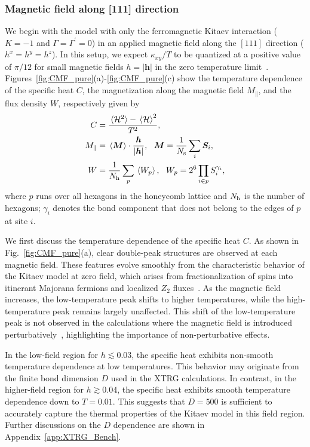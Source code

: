 \documentclass[twocolumn,superscriptaddress,showpacs, longbibliography, aps, prx]{revtex4-2}
\def\vec#1{\boldsymbol #1}
\begin{document}
\subsubsection{Magnetic field along [111] direction}\label{subsec:pureKitaev_h111}
We begin with the model with only the ferromagnetic Kitaev interaction ($K=-1$ and $\Gamma = \Gamma^\prime = 0$) in an applied magnetic field along the $[111]$ direction ($h^x=h^y=h^z$). 
In this setup, we expect $\kappa_{xy}/T$ to be quantized at a positive value of $\pi/12$ for small magnetic fields $h = |\vec{h}|$ in the zero temperature limit~\cite{Kitaev2006}. 
Figures~\ref{fig:CMF_pure}(a)-\ref{fig:CMF_pure}(c) show the temperature dependence of the specific heat $C$, the magnetization along the magnetic field $M_{\parallel}$, and the flux density $W$, respectively given by
\begin{align}
C&=\frac{\ev*{{\cal H}^{2}}-\ev*{{\cal H}}^2}{T^2}, \label{eq:C}\\
M_{\parallel}&=\ev*{\vec{M}}
\cdot\frac{\vec{h}}{|\vec{h}|},~~\vec{M}=\frac{1}{N_{\rm s}}\sum_{i}\vec{S}_{i}, \label{eq:Mag}\\
W&=\frac{1}{N_{\rm h}}\sum_{p}\ev*{W_{p}}, 
~~W_{p}=2^6\prod_{i\in p}S^{\gamma_{i}}_{i} \label{eq:W},
\end{align}
where $p$ runs over all hexagons in the honeycomb lattice and $N_{\rm h}$ is the number of hexagons; $\gamma_{i}$ denotes the bond component that does not belong to the edges of $p$ at site $i$.

We first discuss the temperature dependence of the specific heat $C$.
As shown in Fig.~\ref{fig:CMF_pure}(a), clear double-peak structures are observed at each magnetic field.
These features evolve smoothly from the characteristic behavior of the Kitaev model at zero field, which arises from fractionalization of spins into itinerant Majorana fermions and localized $Z_2$ fluxes~\cite{NasuUM2014,NasuUM2015}.
As the magnetic field increases, the low-temperature peak shifts to higher temperatures, while the high-temperature peak remains largely unaffected. 
This shift of the low-temperature peak is not observed in the calculations where the magnetic field is introduced perturbatively~\cite{NasuYM2017}, highlighting the importance of non-perturbative effects.

In the low-field region for $h\lesssim 0.03$, the specific heat exhibits non-smooth temperature dependence at low temperatures. 
This behavior may originate from the finite bond dimension $D$ used in the XTRG calculations. 
In contrast, in the higher-field region for $h \gtrsim 0.04$, the specific heat exhibits smooth temperature dependence down to $T=0.01$. 
This suggests that $D=500$ is sufficient to accurately capture the thermal properties of the Kitaev model in this field region. 
Further discussions on the $D$ dependence are shown in Appendix~\ref{app:XTRG_Bench}. 
\end{document}
